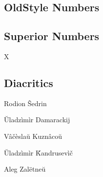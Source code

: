 \documentclass{article}
\begin{document}
\subsection*{OldStyle Numbers}

{}

\subsection*{Superior Numbers}

X

\subsection*{Diacritics}

\mbox{}\par
Rodion \^{S}edrin 

\u{U}ladz\`{i}m\`{i}r Damarackij

V\^{a}\v{c}\`{e}sla\u{u} Kuzn\^{a}co\u{u}

\u{U}ladz\`{i}m\`{i}r \v{K}andrusev\`{i}\v{c}

Aleg Zal\"{e}tne\u{u}
\end{document}
